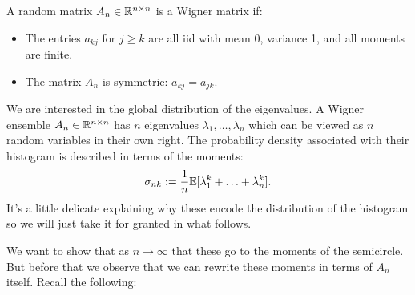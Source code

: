 \begin{definition}[Wigner] A random matrix $A_n \in {\mathbb R}^{n \times n}$ is a Wigner matrix if:

\begin{itemize}
\item[1. ] The entries $a_{kj}$ for $j \ensuremath{\geq} k$ are all iid with mean 0, variance 1, and all moments are finite.


\item[2. ] The matrix $A_n$ is symmetric: $a_{kj} = a_{jk}$.

\end{itemize}
\end{definition}

We are interested in the global distribution of the eigenvalues. A Wigner ensemble $A_n \in {\mathbb R}^{n \times n}$ has $n$ eigenvalues $\ensuremath{\lambda}_1, \ensuremath{\ldots}, \ensuremath{\lambda}_n$ which can be viewed as $n$ random variables in their own right. The probability density associated with their histogram is described in terms of the moments:
\[
\sigma_{nk} := {1 \over n} {\mathbb E}[\lambda_1^k + \ldots + \lambda_n^k].
\]
It's a little delicate explaining why these encode the distribution of the histogram so we will just take it for granted in what follows.

We want to show that as $n \ensuremath{\rightarrow} \ensuremath{\infty}$ that these go to the moments of the semicircle. But before that we observe that we can rewrite these moments in terms of $A_n$ itself. Recall the following:

